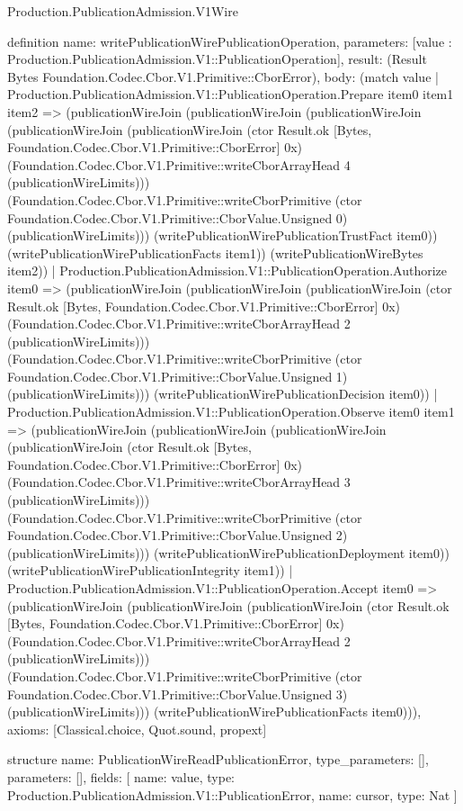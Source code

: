 \begin{lexlean}{Production.PublicationAdmission.V1Wire}
\begin{semanticmodule}
definition{
  name: writePublicationWirePublicationOperation,
  parameters: [value : Production.PublicationAdmission.V1::PublicationOperation],
  result: (Result Bytes Foundation.Codec.Cbor.V1.Primitive::CborError),
  body: (match value
    | Production.PublicationAdmission.V1::PublicationOperation.Prepare item0 item1 item2 => (publicationWireJoin (publicationWireJoin (publicationWireJoin (publicationWireJoin (publicationWireJoin (ctor Result.ok [Bytes, Foundation.Codec.Cbor.V1.Primitive::CborError] 0x) (Foundation.Codec.Cbor.V1.Primitive::writeCborArrayHead 4 (publicationWireLimits))) (Foundation.Codec.Cbor.V1.Primitive::writeCborPrimitive (ctor Foundation.Codec.Cbor.V1.Primitive::CborValue.Unsigned 0) (publicationWireLimits))) (writePublicationWirePublicationTrustFact item0)) (writePublicationWirePublicationFacts item1)) (writePublicationWireBytes item2))
    | Production.PublicationAdmission.V1::PublicationOperation.Authorize item0 => (publicationWireJoin (publicationWireJoin (publicationWireJoin (ctor Result.ok [Bytes, Foundation.Codec.Cbor.V1.Primitive::CborError] 0x) (Foundation.Codec.Cbor.V1.Primitive::writeCborArrayHead 2 (publicationWireLimits))) (Foundation.Codec.Cbor.V1.Primitive::writeCborPrimitive (ctor Foundation.Codec.Cbor.V1.Primitive::CborValue.Unsigned 1) (publicationWireLimits))) (writePublicationWirePublicationDecision item0))
    | Production.PublicationAdmission.V1::PublicationOperation.Observe item0 item1 => (publicationWireJoin (publicationWireJoin (publicationWireJoin (publicationWireJoin (ctor Result.ok [Bytes, Foundation.Codec.Cbor.V1.Primitive::CborError] 0x) (Foundation.Codec.Cbor.V1.Primitive::writeCborArrayHead 3 (publicationWireLimits))) (Foundation.Codec.Cbor.V1.Primitive::writeCborPrimitive (ctor Foundation.Codec.Cbor.V1.Primitive::CborValue.Unsigned 2) (publicationWireLimits))) (writePublicationWirePublicationDeployment item0)) (writePublicationWirePublicationIntegrity item1))
    | Production.PublicationAdmission.V1::PublicationOperation.Accept item0 => (publicationWireJoin (publicationWireJoin (publicationWireJoin (ctor Result.ok [Bytes, Foundation.Codec.Cbor.V1.Primitive::CborError] 0x) (Foundation.Codec.Cbor.V1.Primitive::writeCborArrayHead 2 (publicationWireLimits))) (Foundation.Codec.Cbor.V1.Primitive::writeCborPrimitive (ctor Foundation.Codec.Cbor.V1.Primitive::CborValue.Unsigned 3) (publicationWireLimits))) (writePublicationWirePublicationFacts item0))),
  axioms: [Classical.choice, Quot.sound, propext]
}

structure{
  name: PublicationWireReadPublicationError,
  type_parameters: [],
  parameters: [],
  fields: [
    {name: value, type: Production.PublicationAdmission.V1::PublicationError},
    {name: cursor, type: Nat}
  ]
}


\end{semanticmodule}
\end{lexlean}

